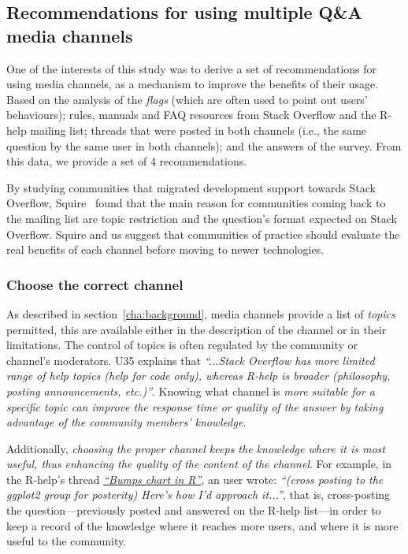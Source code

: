 \subsection{Recommendations for using multiple Q\&A media channels}

    One of the interests of this study was to derive a set of recommendations for using media channels, as a mechanism to improve the benefits of their usage.
    Based on the analysis of the \textit{flags} (which are often used to point out users' behaviours); rules, manuals and FAQ resources from Stack Overflow and the R-help mailing list; threads that were posted in both channels (i.e., the same question by the same user in both channels); and the answers of the survey.
    From this data, we provide a set of 4 recommendations.

    By studying communities that migrated development support towards Stack Overflow, Squire~\cite{Squire2015a} found that the main reason for communities coming back to the mailing list are topic restriction and the question's format expected on Stack Overflow.
    Squire and us suggest that communities of practice should evaluate the real benefits of each channel before moving to newer technologies.

\subsubsection{Choose the correct channel}

    As described in section~\ref{cha:background}, media channels provide a list of \textit{topics} permitted, this are available either in the description of the channel or in their limitations.
    The control of topics is often regulated by the community or channel's moderators.
    U35 explains that \textit{``...Stack Overflow has more limited range of help topics (help for code only), whereas R-help is broader (philosophy, posting announcements, etc.)''}.
    Knowing what channel is \emph{more suitable for a specific topic can improve the response time or quality of the answer by taking advantage of the community members' knowledge}.

    Additionally, \emph{choosing the proper channel keeps the knowledge where it is most useful, thus enhancing the quality of the content of the channel}.
    For example, in the R-help's thread \textit{\href{http://goo.gl/EJHWrs}{``Bumps chart in R''}}, an user wrote: \textit{``(cross posting to the ggplot2 group for posterity) Here's how I'd approach it...''}, that is, cross-posting the question---previously posted and answered on the R-help list---in order to keep a record of the knowledge where it reaches more users, and where it is more useful to the community.

